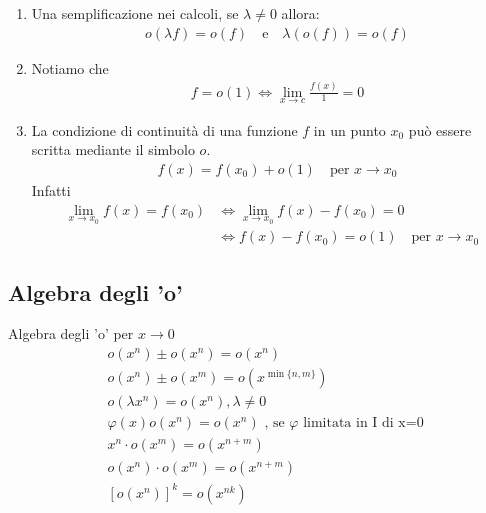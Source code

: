\documentclass{book}
\begin{document}
\begin{minipage}{\textwidth}
\begin{proposition}
\begin{enumerate}[label=\roman*., start=1]
      \item Una semplificazione nei calcoli, se \(\lambda \neq 0\) allora:
            \begin{align*}
               & o(\lambda f) = o(f) \quad \text{e} \quad \lambda(o(f)) = o(f)
            \end{align*}
      \item Notiamo che
            \begin{align*}
               & f = o(1) \iff \lim_{x \to c} \frac{f(x)}{1} = 0
            \end{align*}
      \item La condizione di continuità di una funzione \(f\) in un punto \(x_0\) può essere scritta mediante il simbolo \(o\).
            \begin{align*}
               & f(x) = f(x_0) + o(1) \quad \text{per } x \to x_0
            \end{align*}
            Infatti
            \begin{align*}
              \lim_{x \to x_0} f(x) = f(x_0) & \iff \lim_{x \to x_0} f(x) - f(x_0) = 0               \\
                                             & \iff f(x) - f(x_0) = o(1) \quad \text{per } x \to x_0
            \end{align*}
    \end{enumerate}
  \end{proposition}
\end{minipage}
\begin{proposition}
  \subsection{Algebra degli 'o'}
  Algebra degli 'o' per \(x \to 0\)
  \begin{align*}
     & o(x^n) \pm o(x^n) = o(x^n)                                                    \\
     & o(x^n) \pm o(x^m) = o(x^{\min\{n,m\}})                                        \\
     & o(\lambda x^n) = o(x^n), \lambda \neq 0                                       \\
     & \varphi(x) o(x^n) = o(x^n) \text{ , se } \varphi \text{ limitata in I di x=0} \\
     & x^n \cdot o(x^m) = o(x^{n+m})                                                 \\
     & o(x^n) \cdot o(x^m) = o(x^{n+m})                                              \\
     & [o(x^n)]^k = o(x^{nk})
  \end{align*}
\end{proposition}
\end{document}

